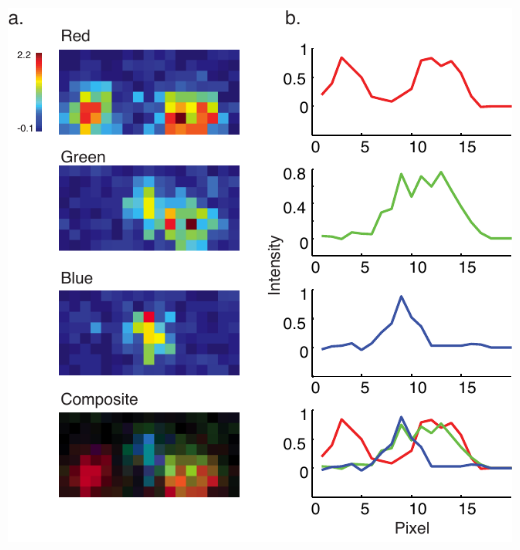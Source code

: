 \lipsum[2-6]

\begin{FPfigure}
\includegraphics[width=\textwidth]{figures/fullpage}
	\caption[Short figure name.]{\lipsum[1]}
\end{FPfigure}
\afterpage{\clearpage}

\lipsum

